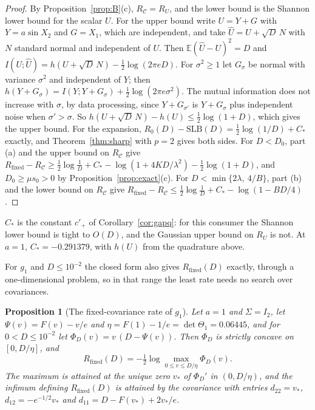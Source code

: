 \documentclass[11pt,onecolumn]{IEEEtran}
\newtheorem{proposition}[theorem]{Proposition}
\newcommand{\E}{\mathbb{E}}
\newcommand{\Rfix}{R_{\mathrm{fixed}}}
\newcommand{\RC}{R_{\mathcal C}}
\begin{document}
\begin{proof}
By Proposition~\ref{prop:B}(c), $\RC=R_U$, and the lower bound is the Shannon lower bound
for the scalar $U$. For the upper bound write $U=Y+G$ with $Y=a\sin X_2$ and $G=X_1$,
which are independent, and take $\hat U=U+\sqrt D\,N$ with $N$ standard normal and
independent of $U$. Then $\E(\hat U-U)^2=D$ and
$I(U;\hat U)=h(U+\sqrt D\,N)-\tfrac12\log(2\pi eD)$. For $\sigma^2\ge1$ let $G_\sigma$ be
normal with variance $\sigma^2$ and independent of $Y$; then
$h(Y+G_\sigma)=I(Y;Y+G_\sigma)+\tfrac12\log(2\pi e\sigma^2)$. The mutual information does
not increase with $\sigma$, by data processing, since $Y+G_{\sigma'}$ is $Y+G_\sigma$ plus
independent noise when $\sigma'>\sigma$. So
$h(U+\sqrt D\,N)-h(U)\le\tfrac12\log(1+D)$, which gives the upper bound. For the
expansion, $R_0(D)-\mathrm{SLB}(D)=\tfrac12\log(1/D)+C_*$ exactly, and
Theorem~\ref{thm:sharp} with $p=2$ gives both sides. For $D<D_0$, part (a) and the upper
bound on $\RC$ give
$\Rfix-\RC\ge\tfrac12\log\tfrac1D+C_*-\log(1+4KD/\lambda^2)-\tfrac12\log(1+D)$, and
$D_0\ge\mu s_0>0$ by Proposition~\ref{prop:exact}(c). For $D<\min\{2\lambda,\ 4/B\}$, part
(b) and the lower bound on $\RC$ give
$\Rfix-\RC\le\tfrac12\log\tfrac1D+C_*-\log(1-BD/4)$.
\end{proof}

$C_*$ is the constant $c'_+$ of Corollary~\ref{cor:gapq}: for this consumer the Shannon
lower bound is tight to $O(D)$, and the Gaussian upper bound on $R_U$ is not. At $a=1$,
$C_*=-0.291379$, with $h(U)$ from the quadrature above.

For $g_1$ and $D\le10^{-2}$ the closed form also gives $\Rfix(D)$ exactly, through a
one-dimensional problem, so in that range the least rate needs no search over
covariances.

\begin{proposition}[The fixed-covariance rate of $g_1$]\label{prop:rate}
Let $a=1$ and $\Sigma=I_2$, let $\Psi(v)=F(v)-v/e$ and
$\eta=F(1)-1/e=\det\Theta_1=0.06445$, and for
$0<D\le10^{-2}$ let $\Phi_D(v)=v\,(D-\Psi(v))$. Then $\Phi_D$ is strictly concave on
$[0,D/\eta]$, and
\[
\Rfix(D)=-\tfrac12\log\max_{0\le v\le D/\eta}\Phi_D(v).
\]
The maximum is attained at the unique zero $v_*$ of $\Phi_D'$ in $(0,D/\eta)$, and
the infimum defining $\Rfix(D)$ is attained by the covariance with entries
$d_{22}=v_*$, $d_{12}=-e^{-1/2}v_*$ and $d_{11}=D-F(v_*)+2v_*/e$.
\end{proposition}
\end{document}

